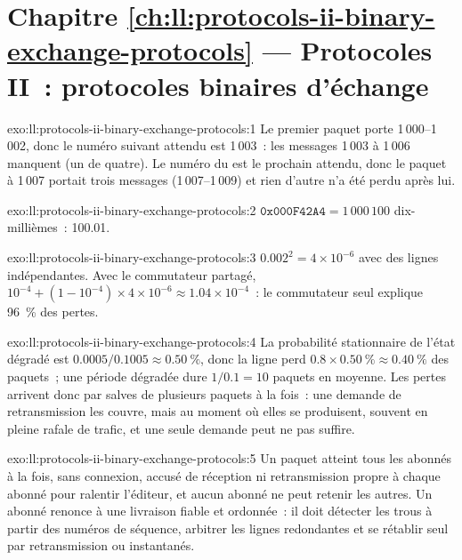 \section*{Chapitre \ref{ch:ll:protocols-ii-binary-exchange-protocols} --- Protocoles II~: protocoles binaires d'échange}

\begin{solution}{exo:ll:protocols-ii-binary-exchange-protocols:1}
Le premier paquet porte 1\,000--1\,002, donc le numéro suivant attendu est 1\,003~: les messages 1\,003 à 1\,006 manquent (un
 de quatre). Le numéro du  est le prochain attendu, donc le paquet à 1\,007 portait trois messages (1\,007--1\,009) et
rien d'autre n'a été perdu après lui.
\end{solution}

\begin{solution}{exo:ll:protocols-ii-binary-exchange-protocols:2}
$\mathtt{0x000F42A4} = 1\,000\,100$ dix-millièmes~: 100.01.
\end{solution}

\begin{solution}{exo:ll:protocols-ii-binary-exchange-protocols:3}
$0.002^2 = 4 \times 10^{-6}$ avec des lignes indépendantes. Avec le commutateur partagé, $10^{-4} + (1 - 10^{-4}) \times 4 \times 10^{-6}
\approx 1.04 \times 10^{-4}$~: le commutateur seul explique 96~\% des pertes.
\end{solution}

\begin{solution}{exo:ll:protocols-ii-binary-exchange-protocols:4}
La probabilité stationnaire de l'état dégradé est $0.0005/0.1005 \approx 0.50~\%$, donc la ligne perd $0.8 \times 0.50~\% \approx 0.40~\%$
des paquets~; une période dégradée dure $1/0.1 = 10$ paquets en moyenne. Les pertes arrivent donc par salves de plusieurs paquets à la fois~: une
demande de retransmission les couvre, mais au moment où elles se produisent, souvent en pleine rafale de trafic, et une seule demande peut
ne pas suffire.
\end{solution}

\begin{solution}{exo:ll:protocols-ii-binary-exchange-protocols:5}
Un paquet  atteint tous les abonnés à la fois, sans connexion, accusé de réception ni retransmission propre à chaque abonné pour
ralentir l'éditeur, et aucun abonné ne peut retenir les autres. Un abonné renonce à une livraison fiable et ordonnée~: il doit
détecter les trous à partir des numéros de séquence, arbitrer les lignes redondantes et se rétablir seul par retransmission ou instantanés.
\end{solution}

